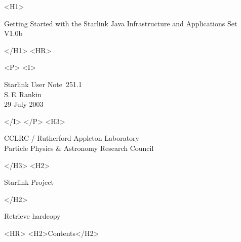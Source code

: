 \documentclass[twoside,11pt]{article}
\newcommand{\stardoccategory}  {Starlink User Note}
\newcommand{\stardocsource}    {sun\stardocnumber}
\newcommand{\stardocnumber}    {251.1}
\newcommand{\stardocauthors}   {S.\,E.\,Rankin}
\newcommand{\stardocdate}      {29 July 2003}
\newcommand{\stardoctitle}     {Getting Started with the Starlink Java Infrastructure and Applications Set}
\newcommand{\stardocversion}   {V1.0b}
\newcommand{\stardocmanual}    {}
\newcommand{\htmladdnormallink}[2]{#1}
\newcommand{\htmladdimg}[1]{}
\newcommand{\htmlref}[2]{#1}
\newcommand{\htmladdtonavigation}[1]{}
\newcommand{\xlabel}[1]{}
\renewcommand{\_}{\texttt{\symbol{95}}}
\begin{document}
\begin{htmlonly}
   \xlabel{}
   \begin{rawhtml} <H1> \end{rawhtml}
      \stardoctitle\\
      \stardocversion\\
      \stardocmanual
   \begin{rawhtml} </H1> <HR> \end{rawhtml}


   \begin{rawhtml} <P> <I> \end{rawhtml}
   \stardoccategory\ \stardocnumber \\
   \stardocauthors \\
   \stardocdate
   \begin{rawhtml} </I> </P> <H3> \end{rawhtml}
      \htmladdnormallink{CCLRC / Rutherford Appleton Laboratory}
                        {http://www.cclrc.ac.uk} \\
      \htmladdnormallink{Particle Physics \& Astronomy Research Council}
                        {http://www.pparc.ac.uk} \\
   \begin{rawhtml} </H3> <H2> \end{rawhtml}
      \htmladdnormallink{Starlink Project}{http://www.starlink.ac.uk/}
   \begin{rawhtml} </H2> \end{rawhtml}
   \htmladdnormallink{\htmladdimg{source.gif} Retrieve hardcopy}
      {http://www.starlink.ac.uk/cgi-bin/hcserver?\stardocsource}\\

  \label{stardoccontents}
  \begin{rawhtml} 
    <HR>
    <H2>Contents</H2>
  \end{rawhtml}
  \htmladdtonavigation{\htmlref{\htmladdimg{contents_motif.gif}}
        {stardoccontents}}

\end{htmlonly}
\end{document}
